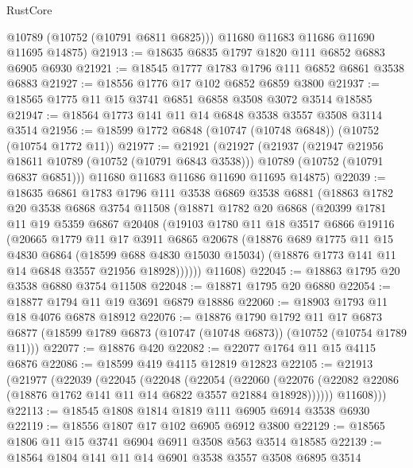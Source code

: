 \begin{lexlean}{RustCore}
\begin{coremodule}
        @10789
        (@10752 (@10791 @6811 @6825)))
      @11680
      @11683
      @11686
      @11690
      @11695
      @14875)
@21913 := @18635 @6835 @1797 @1820 @111 @6852 @6883 @6905 @6930
@21921 := @18545 @1777 @1783 @1796 @111 @6852 @6861 @3538 @6883
@21927 := @18556 @1776 @17 @102 @6852 @6859 @3800
@21937 := @18565 @1775 @11 @15 @3741 @6851 @6858 @3508 @3072 @3514 @18585
@21947 := @18564 @1773 @141 @11 @14 @6848 @3538 @3557 @3508 @3114 @3514
@21956 := @18599 @1772 @6848 (@10747 (@10748 @6848)) (@10752 (@10754 @1772 @11))
@21977 := @21921
    (@21927
      (@21937
        (@21947 @21956 @18611 @10789 (@10752 (@10791 @6843 @3538)))
        @10789
        (@10752 (@10791 @6837 @6851)))
      @11680
      @11683
      @11686
      @11690
      @11695
      @14875)
@22039 := @18635
    @6861
    @1783
    @1796
    @111
    @3538
    @6869
    @3538
    @6881
    (@18863
      @1782
      @20
      @3538
      @6868
      @3754
      @11508
      (@18871
        @1782
        @20
        @6868
        (@20399
          @1781
          @11
          @19
          @5359
          @6867
          @20408
          (@19103
            @1780
            @11
            @18
            @3517
            @6866
            @19116
            (@20665
              @1779
              @11
              @17
              @3911
              @6865
              @20678
              (@18876
                @689
                @1775
                @11
                @15
                @4830
                @6864
                (@18599 @688 @4830 @15030 @15034)
                (@18876 @1773 @141 @11 @14 @6848 @3557 @21956 @18928))))))
      @11608)
@22045 := @18863 @1795 @20 @3538 @6880 @3754 @11508
@22048 := @18871 @1795 @20 @6880
@22054 := @18877 @1794 @11 @19 @3691 @6879 @18886
@22060 := @18903 @1793 @11 @18 @4076 @6878 @18912
@22076 := @18876
    @1790
    @1792
    @11
    @17
    @6873
    @6877
    (@18599 @1789 @6873 (@10747 (@10748 @6873)) (@10752 (@10754 @1789 @11)))
@22077 := @18876 @420
@22082 := @22077 @1764 @11 @15 @4115 @6876
@22086 := @18599 @419 @4115 @12819 @12823
@22105 := @21913
    (@21977
      (@22039
        (@22045
          (@22048
            (@22054
              (@22060
                (@22076 (@22082 @22086 (@18876 @1762 @141 @11 @14 @6822 @3557 @21884 @18928))))))
          @11608)))
@22113 := @18545 @1808 @1814 @1819 @111 @6905 @6914 @3538 @6930
@22119 := @18556 @1807 @17 @102 @6905 @6912 @3800
@22129 := @18565 @1806 @11 @15 @3741 @6904 @6911 @3508 @563 @3514 @18585
@22139 := @18564 @1804 @141 @11 @14 @6901 @3538 @3557 @3508 @6895 @3514

\end{coremodule}
\end{lexlean}
